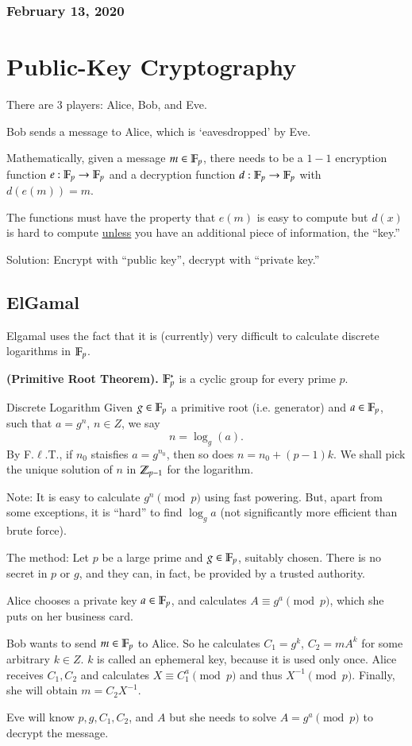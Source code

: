 \subsubsection*{February 13, 2020}
\section{Public-Key Cryptography}
There are 3 players: Alice, Bob, and Eve. 

Bob sends a message to Alice, which is `eavesdropped' by Eve. 

Mathematically, given a message $m\in \mathbb{F}_p$, there needs to be a $1-1$ encryption function $e:\mathbb{F}_p\to \mathbb{F}_p$ and a decryption function $d:\mathbb{F}_p\to \mathbb{F}_p$ with $d(e(m))=m$. 

The functions must have the property that $e(m)$ is easy to compute but $d(x)$ is hard to compute \ul{unless} you have an additional piece of information, the ``key.'' 

Solution: Encrypt with ``public key'', decrypt with ``private key.'' 

\subsection{ElGamal}
Elgamal uses the fact that it is (currently) very difficult to calculate discrete logarithms in $\mathbb{F}_p$. 

\begin{theorem}
	\textbf{(Primitive Root Theorem).} $\mathbb{F}_p^*$ is a cyclic group for every prime $p$. 
\end{theorem}

\begin{defn}{Discrete Logarithm}
	Given $g\in \mathbb{F}_p$ a primitive root (i.e. generator) and $a\in \mathbb{F}_p$, such that $a=g^n$, $n\in Z$, we say
	\begin{equation}
		n=\log_g(a).
	\end{equation}
	By F.$\ell$.T., if $n_0$ staisfies $a=g^{n_0}$, then so does $n=n_0+(p-1)k$. We shall pick the unique solution of $n$ in $\mathbb{Z}_{p-1}$ for the logarithm. 
\end{defn}

Note: It is easy to calculate $g^n\pmod{p}$ using fast powering. But, apart from some exceptions, it is ``hard'' to find $\log_g a$ (not significantly more efficient than brute force). 

The method: Let $p$ be a large prime and $g\in \mathbb{F}_p$, suitably chosen. There is no secret in $p$ or $g$, and they can, in fact, be provided by a trusted authority. 

Alice chooses a private key $a\in \mathbb{F}_p$, and calculates $A\equiv g^a\pmod{p}$, which she puts on her business card. 

Bob wants to send $m\in \mathbb{F}_p$ to Alice. So he calculates $C_1=g^k$, $C_2=mA^k$ for some arbitrary $k\in Z$. $k$ is called an ephemeral key, because it is used only once. Alice receives $C_1, C_2$ and calculates $X\equiv C_1^a\pmod{p}$ and thus $X^{-1}\pmod{p}$. Finally, she will obtain $m = C_2X^{-1}$. 

Eve will know $p, g, C_1, C_2$, and $A$ but she needs to solve $A=g^a\pmod{p}$ to decrypt the message. 